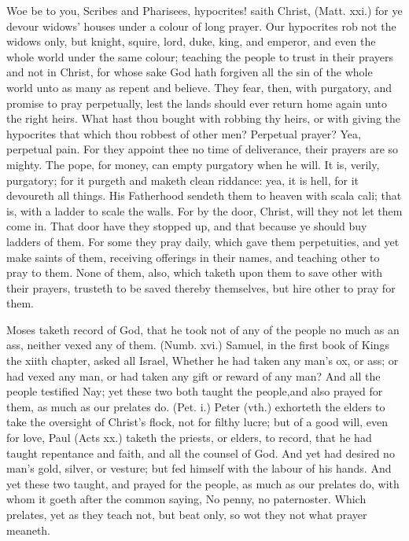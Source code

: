 Woe be to you, Scribes and Pharisees, hypocrites! saith 
Christ, (Matt. xxi.) for ye devour widows' houses under a 
colour of long prayer. Our hypocrites rob not the widows 
only, but knight, squire, lord, duke, king, and emperor, and 
even the whole world under the same colour; teaching 
the people to trust in their prayers and not in Christ, for 
whose sake God hath forgiven all the sin of the whole 
world unto as many as repent and believe. They fear, 
then, with purgatory, and promise to pray perpetually, lest 
the lands should ever return home again unto the right 
heirs. What hast thou bought with robbing thy heirs, 
or with giving the hypocrites that which thou robbest of 
other men? Perpetual prayer? Yea, perpetual pain. 
For they appoint thee no time of deliverance, their 
prayers are so mighty. The pope, for money, can empty 
purgatory when he will. It is, verily, purgatory; for it 
purgeth and maketh clean riddance: yea, it is hell, for it 
devoureth all things. His Fatherhood sendeth them to 
heaven with scala cali; that is, with a ladder to scale the 
walls. For by the door, Christ, will they not let them 
come in. That door have they stopped up, and that 
because ye should buy ladders of them. For some they 
pray daily, which gave them perpetuities, and yet make 
saints of them, receiving offerings in their names, and 
teaching other to pray to them. None of them, also, 
which taketh upon them to save other with their prayers, 
trusteth to be saved thereby themselves, but hire other to 
pray for them. 

Moses taketh record of God, that he took not of any 
of the people no much as an ass, neither vexed any of 
them. (Numb. xvi.) Samuel, in the first book of Kings 
the xiith chapter, asked all Israel, Whether he had taken 
any man's ox, or ass; or had vexed any man, or had taken 
any gift or reward of any man? And all the people testified
Nay; yet these two both taught the people,and also 
prayed for them, as much as our prelates do. (Pet. i.) 
Peter (vth.) exhorteth the elders to take the oversight of 
Christ's flock, not for filthy lucre; but of a good will, 
even for love, Paul (Acts xx.) taketh the priests, or 
elders, to record, that he had taught repentance and faith, 
and all the counsel of God. And yet had desired no 
man's gold, silver, or vesture; but fed himself with the 
labour of his hands. And yet these two taught, and 
prayed for the people, as much as our prelates do, with 
whom it goeth after the common saying, No penny, no 
paternoster. Which prelates, yet as they teach not, but 
beat only, so wot they not what prayer meaneth. 

